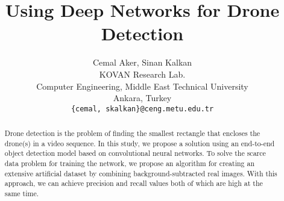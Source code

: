 \documentclass[10pt,twocolumn,letterpaper]{article}
\begin{document}
\title{Using Deep Networks for Drone Detection}

\author{Cemal Aker, Sinan Kalkan\\
KOVAN Research Lab.\\
Computer Engineering, Middle East Technical University\\
Ankara, Turkey\\
{\tt\small \{cemal, skalkan\}@ceng.metu.edu.tr}
}
\maketitle


\begin{abstract}
Drone detection is the problem of finding the smallest rectangle that encloses the drone(s) in a video sequence. In this study, we propose a solution using an end-to-end object detection model based on convolutional neural networks. To solve the scarce data problem for training the network, we propose an algorithm for creating an extensive artificial dataset by combining background-subtracted real images. With this approach, we can achieve precision and recall values both of which are high at the same time.
\end{abstract}
\end{document}
